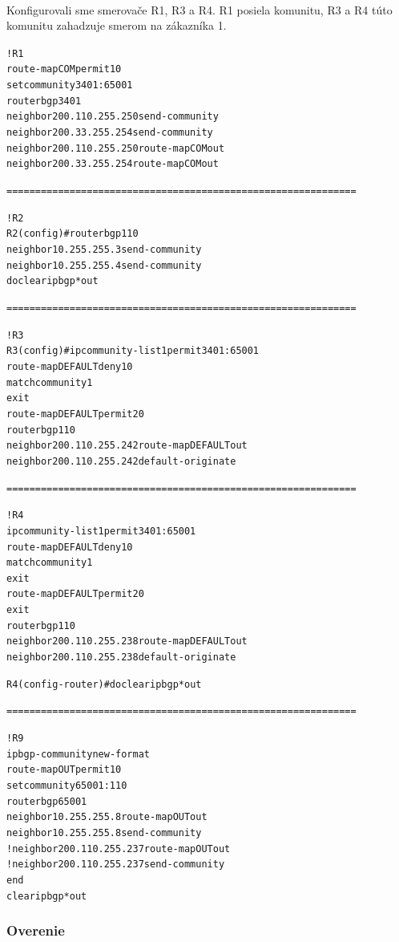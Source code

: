 \documentclass[12pt,twoside,a4paper]{report}
\begin{document}
\paragraph{}
Konfigurovali sme smerovače R1, R3 a R4. R1 posiela komunitu, R3 a R4 túto komunitu zahadzuje smerom na zákazníka 1.

\noindent
{\selectfont
\begin{small}
\begin{alltt}
!R1
route-map COM permit 10
  set community 3401:65001
router bgp 3401
neighbor 200.110.255.250 send-community
neighbor 200.33.255.254 send-community
  neighbor 200.110.255.250 route-map COM out
  neighbor 200.33.255.254 route-map COM out


=============================================================


!R2
R2(config)#router bgp 110
  neighbor 10.255.255.3 send-community
  neighbor 10.255.255.4 send-community
do clear ip bgp * out


=============================================================


!R3
R3(config)#ip community-list 1 permit 3401:65001
route-map DEFAULT deny 10
  match community 1
  exit
route-map DEFAULT permit 20
router bgp 110
  neighbor 200.110.255.242 route-map DEFAULT out
  neighbor 200.110.255.242 default-originate


=============================================================


!R4
ip community-list 1 permit 3401:65001
route-map DEFAULT deny 10
  match community 1
  exit
route-map DEFAULT permit 20
exit
router bgp 110
  neighbor 200.110.255.238 route-map DEFAULT out
  neighbor 200.110.255.238 default-originate

R4(config-router)#do clear ip bgp * out


=============================================================


!R9
ip bgp-community new-format
route-map OUT permit 10
set community 65001:110
router bgp 65001
neighbor 10.255.255.8 route-map OUT out
neighbor 10.255.255.8 send-community
!neighbor 200.110.255.237 route-map OUT out
!neighbor 200.110.255.237 send-community
end
clear ip bgp * out

\end{alltt}
\end{small}
}


\subsubsection{Overenie}
\end{document}
